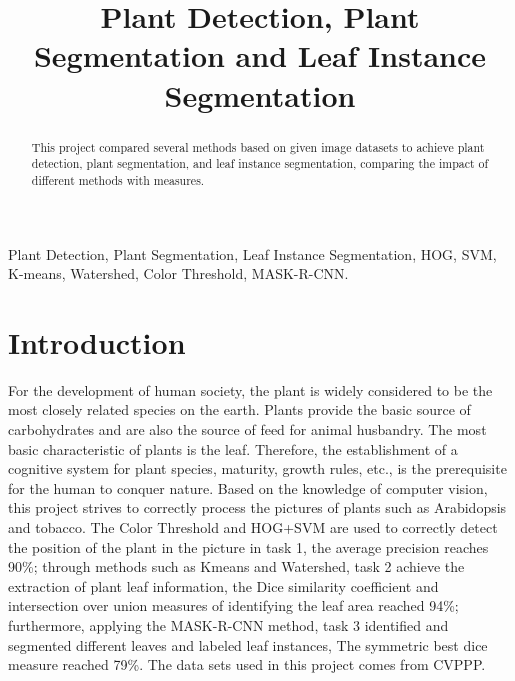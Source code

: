 \documentclass[conference]{IEEEtran}
\begin{document}
\title{Plant Detection, Plant Segmentation and Leaf Instance Segmentation}


\author{
}

\maketitle

\begin{abstract}
This project compared several methods based on given image datasets to achieve plant detection, plant segmentation, and leaf instance segmentation, comparing the impact of different methods with measures.
\end{abstract}

\begin{IEEEkeywords}
Plant Detection, Plant Segmentation, Leaf Instance Segmentation, HOG, SVM, K-means, Watershed, Color Threshold, MASK-R-CNN.
\end{IEEEkeywords}

\section{Introduction}
For the development of human society, the plant is widely considered to be the most closely related species on the earth. 
Plants provide the basic source of carbohydrates and are also the source of feed for animal husbandry. 
The most basic characteristic of plants is the leaf. 
Therefore, the establishment of a cognitive system for plant species, maturity, growth rules, etc., is the prerequisite for the human to conquer nature. 
Based on the knowledge of computer vision, this project strives to correctly process the pictures of plants such as Arabidopsis and tobacco. 
The Color Threshold and HOG+SVM are used to correctly detect the position of the plant in the picture in task 1, the average precision reaches 90\%; 
through methods such as Kmeans and Watershed, task 2 achieve the extraction of plant leaf information, the Dice similarity coefficient and intersection over union measures of identifying the leaf area reached 94\%; 
furthermore, applying the MASK-R-CNN method, task 3 identified and segmented different leaves and labeled leaf instances, The symmetric best dice measure reached 79\%. 
The data sets used in this project comes from CVPPP.
\end{document}
